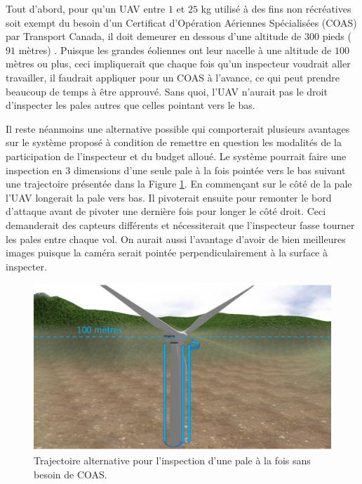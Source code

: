 Tout d'abord, pour qu'un UAV entre $1$ et $25$ kg utilisé à des fins non récréatives soit exempt du besoin d'un Certificat d'Opération Aériennes Spécialisées (COAS) par Transport Canada, il doit demeurer en dessous d'une altitude de $300$ pieds ($91$ mètres) \citep{transportscanada2016}. Puisque les grandes éoliennes ont leur nacelle à une altitude de $100$ mètres ou plus, ceci impliquerait que chaque fois qu'un inspecteur voudrait aller travailler, il faudrait appliquer pour un COAS à l'avance, ce qui peut prendre beaucoup de temps à être approuvé. Sans quoi, l'UAV n'aurait pas le droit d'inspecter les pales autres que celles pointant vers le bas.

Il reste néanmoins une alternative possible qui comporterait plusieurs avantages sur le système proposé à condition de remettre en question les modalités de la participation de l'inspecteur et du budget alloué. Le système pourrait faire une inspection en 3 dimensions d'une seule pale à la fois pointée vers le bas suivant une trajectoire présentée dans la Figure \ref{fig:alternative}. En commençant sur le côté de la pale l'UAV longerait la pale vers bas. Il pivoterait ensuite pour remonter le bord d'attaque avant de pivoter une dernière fois pour longer le côté droit. Ceci demanderait des capteurs différents et nécessiterait que l'inspecteur fasse tourner les pales entre chaque vol. On aurait aussi l'avantage d'avoir de bien meilleures images puisque la caméra serait pointée perpendiculairement à la surface à inspecter.

\begin{figure}[htb]
  \centering
  \includegraphics[width=\linewidth]{images/supercoolconcept}
  \caption{Trajectoire alternative pour l'inspection d'une pale à la fois sans besoin de COAS.}
  \label{fig:alternative}
\end{figure}

